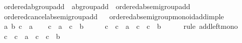 \begin{isabellebody}
\isamarkupfalse%
\ ordered{\isacharunderscore}{\kern0pt}ab{\isacharunderscore}{\kern0pt}group{\isacharunderscore}{\kern0pt}add\ {\isacharequal}{\kern0pt}\ ab{\isacharunderscore}{\kern0pt}group{\isacharunderscore}{\kern0pt}add\ {\isacharplus}{\kern0pt}\ ordered{\isacharunderscore}{\kern0pt}ab{\isacharunderscore}{\kern0pt}semigroup{\isacharunderscore}{\kern0pt}add\isanewline
{}\isanewline
\isanewline
{}\isamarkupfalse%
\ ordered{\isacharunderscore}{\kern0pt}cancel{\isacharunderscore}{\kern0pt}ab{\isacharunderscore}{\kern0pt}semigroup{\isacharunderscore}{\kern0pt}add%
\isadelimproof
\ %
\endisadelimproof
%
\isatagproof
\isacommand{{\isachardot}{\kern0pt}{\isachardot}{\kern0pt}}\isamarkupfalse%
%
\endisatagproof
{\isafoldproof}%
%
\isadelimproof
%
\endisadelimproof
\isanewline
\isanewline
{}\isamarkupfalse%
\ ordered{\isacharunderscore}{\kern0pt}ab{\isacharunderscore}{\kern0pt}semigroup{\isacharunderscore}{\kern0pt}monoid{\isacharunderscore}{\kern0pt}add{\isacharunderscore}{\kern0pt}imp{\isacharunderscore}{\kern0pt}le\isanewline
%
\isadelimproof
%
\endisadelimproof
%
\isatagproof
{}\isamarkupfalse%
\isanewline
\ \ \isamarkupfalse%
\ a\ b\ c\ {\isacharcolon}{\kern0pt}{\isacharcolon}{\kern0pt}\ {\isacharprime}{\kern0pt}a\isanewline
\ \ \isamarkupfalse%
\ {\isachardoublequoteopen}c\ {\isacharplus}{\kern0pt}\ a\ {\isasymle}\ c\ {\isacharplus}{\kern0pt}\ b{\isachardoublequoteclose}\isanewline
\ \ \isamarkupfalse%
\ \isamarkupfalse%
\ {\isachardoublequoteopen}{\isacharparenleft}{\kern0pt}{\isacharminus}{\kern0pt}c{\isacharparenright}{\kern0pt}\ {\isacharplus}{\kern0pt}\ {\isacharparenleft}{\kern0pt}c\ {\isacharplus}{\kern0pt}\ a{\isacharparenright}{\kern0pt}\ {\isasymle}\ {\isacharparenleft}{\kern0pt}{\isacharminus}{\kern0pt}c{\isacharparenright}{\kern0pt}\ {\isacharplus}{\kern0pt}\ {\isacharparenleft}{\kern0pt}c\ {\isacharplus}{\kern0pt}\ b{\isacharparenright}{\kern0pt}{\isachardoublequoteclose}\isanewline
\ \ \ \ \isamarkupfalse%
\ {\isacharparenleft}{\kern0pt}rule\ add{\isacharunderscore}{\kern0pt}left{\isacharunderscore}{\kern0pt}mono{\isacharparenright}{\kern0pt}\isanewline
\ \ \isamarkupfalse%
\ \isamarkupfalse%
\ {\isachardoublequoteopen}{\isacharparenleft}{\kern0pt}{\isacharparenleft}{\kern0pt}{\isacharminus}{\kern0pt}c{\isacharparenright}{\kern0pt}\ {\isacharplus}{\kern0pt}\ c{\isacharparenright}{\kern0pt}\ {\isacharplus}{\kern0pt}\ a\ {\isasymle}\ {\isacharparenleft}{\kern0pt}{\isacharparenleft}{\kern0pt}{\isacharminus}{\kern0pt}c{\isacharparenright}{\kern0pt}\ {\isacharplus}{\kern0pt}\ c{\isacharparenright}{\kern0pt}\ {\isacharplus}{\kern0pt}\ b{\isachardoublequoteclose}\isanewline

\end{isabellebody}
